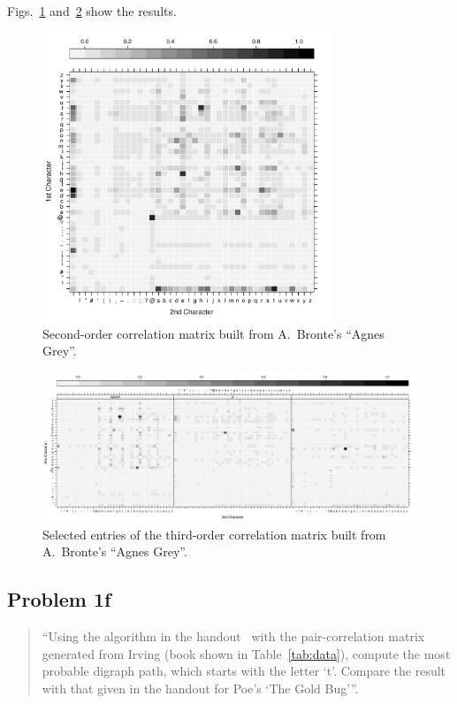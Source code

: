 \documentclass[conference]{IEEEtran}
\begin{document}
Figs.~\ref{fig:agnes_grey_2nd_order} and~\ref{fig:agnes_grey_3rd_order} show the results.

\begin{figure}[!t]
\centering
\includegraphics[width=3.4in]{agnes_grey_2nd_order}
\caption{Second-order correlation matrix built from A.~Bronte's ``Agnes Grey''.}
\label{fig:agnes_grey_2nd_order}
\end{figure}

\begin{figure}[!t]
\centering
\includegraphics[width=\textwidth]{agnes_grey_3rd_order}
\caption{Selected entries of the third-order correlation matrix built from 
A.~Bronte's ``Agnes Grey''.}
\label{fig:agnes_grey_3rd_order}
\end{figure}


\subsection{Problem 1f}

\begin{quote}
``Using the algorithm in the handout~\cite{Bennett1976} with the pair-correlation matrix 
generated from Irving (book shown in Table~\ref{tab:data}), compute the most 
probable digraph path, which starts with the letter `t'. Compare the result with 
that given in the handout for Poe's `The Gold Bug'''.
\end{quote}
\end{document}
